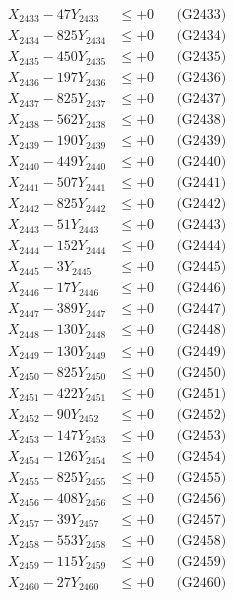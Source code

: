 \documentclass[a4paper,10pt]{article}
\begin{document}
{\begin{align}
X_{2433} - 47Y_{2433} &\leq +0 && \text{(G2433)} \\
X_{2434} - 825Y_{2434} &\leq +0 && \text{(G2434)} \\
X_{2435} - 450Y_{2435} &\leq +0 && \text{(G2435)} \\
X_{2436} - 197Y_{2436} &\leq +0 && \text{(G2436)} \\
X_{2437} - 825Y_{2437} &\leq +0 && \text{(G2437)} \\
X_{2438} - 562Y_{2438} &\leq +0 && \text{(G2438)} \\
X_{2439} - 190Y_{2439} &\leq +0 && \text{(G2439)} \\
X_{2440} - 449Y_{2440} &\leq +0 && \text{(G2440)} \\
\allowbreak
X_{2441} - 507Y_{2441} &\leq +0 && \text{(G2441)} \\
X_{2442} - 825Y_{2442} &\leq +0 && \text{(G2442)} \\
X_{2443} - 51Y_{2443} &\leq +0 && \text{(G2443)} \\
X_{2444} - 152Y_{2444} &\leq +0 && \text{(G2444)} \\
X_{2445} - 3Y_{2445} &\leq +0 && \text{(G2445)} \\
X_{2446} - 17Y_{2446} &\leq +0 && \text{(G2446)} \\
X_{2447} - 389Y_{2447} &\leq +0 && \text{(G2447)} \\
X_{2448} - 130Y_{2448} &\leq +0 && \text{(G2448)} \\
X_{2449} - 130Y_{2449} &\leq +0 && \text{(G2449)} \\
X_{2450} - 825Y_{2450} &\leq +0 && \text{(G2450)} \\
\allowbreak
X_{2451} - 422Y_{2451} &\leq +0 && \text{(G2451)} \\
X_{2452} - 90Y_{2452} &\leq +0 && \text{(G2452)} \\
X_{2453} - 147Y_{2453} &\leq +0 && \text{(G2453)} \\
X_{2454} - 126Y_{2454} &\leq +0 && \text{(G2454)} \\
X_{2455} - 825Y_{2455} &\leq +0 && \text{(G2455)} \\
X_{2456} - 408Y_{2456} &\leq +0 && \text{(G2456)} \\
X_{2457} - 39Y_{2457} &\leq +0 && \text{(G2457)} \\
X_{2458} - 553Y_{2458} &\leq +0 && \text{(G2458)} \\
X_{2459} - 115Y_{2459} &\leq +0 && \text{(G2459)} \\
X_{2460} - 27Y_{2460} &\leq +0 && \text{(G2460)} \\

\end{align}}
\end{document}
